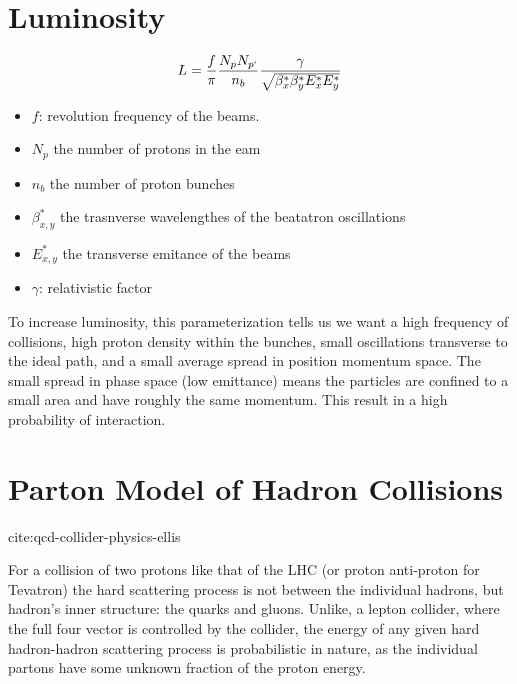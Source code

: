 \section{Luminosity}


\begin{equation}
L = \frac{f}{\pi} \frac{N_p N_{p`}}{n_b} \frac{\gamma}{\sqrt{\beta^*_x \beta^*_y E_x^* E_y^*}}
\end{equation}

\begin{itemize}
\item $f$: revolution frequency of the beams. 
\item $N_p$ the number of protons in the eam
\item $n_b$ the number of proton bunches 
\item $\beta^*_{x,y}$ the trasnverse wavelengthes of the beatatron oscillations
\item $E_{x,y}^*$ the transverse emitance of the beams
\item $\gamma$: relativistic factor
\end{itemize}

To increase luminosity, this parameterization tells us we want a high frequency of collisions, high proton density within
the bunches, small oscillations transverse to the ideal path, and a small average spread in position momentum space. The 
small spread in phase space (low emittance) means the particles are confined to a small area and have roughly the same
 momentum. This result in a high probability of interaction.

\section{Parton Model of Hadron Collisions }

cite:qcd-collider-physics-ellis

For a collision of two protons like that of the LHC (or proton anti-proton for Tevatron) the hard scattering 
process is not between the individual hadrons, but hadron's inner structure: the quarks and gluons. Unlike, 
a lepton collider, where the full four vector is controlled by the collider, the energy of any given hard hadron-hadron
scattering process is probabilistic in nature, as the individual partons have some unknown fraction of the proton energy. 

